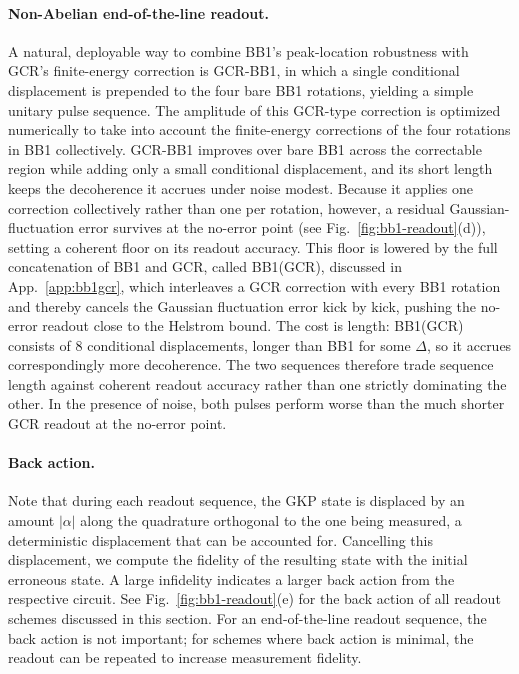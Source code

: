 \documentclass[aps,prx,showpacs,notitlepage,twocolumn,superscriptaddress,nofootinbib,preprintnumbers,floatfix,10pt, longbibliography]{revtex4-2}
\begin{document}
\paragraph{Non-Abelian end-of-the-line readout.} A natural, deployable way to combine BB1's peak-location robustness with GCR's finite-energy correction is GCR-BB1, in which a single conditional displacement is prepended to the four bare BB1 rotations, yielding a simple unitary pulse sequence. The amplitude of this GCR-type correction is optimized numerically to take into account the finite-energy corrections of the four rotations in BB1 collectively. GCR-BB1 improves over bare BB1 across the correctable region while adding only a small conditional displacement, and its short length keeps the decoherence it accrues under noise modest. Because it applies one correction collectively rather than one per rotation, however, a residual Gaussian-fluctuation error survives at the no-error point (see Fig.~\ref{fig:bb1-readout}(d)), setting a coherent floor on its readout accuracy. This floor is lowered by the full concatenation of BB1 and GCR, called BB1(GCR), discussed in App.~\ref{app:bb1gcr}, which interleaves a GCR correction with every BB1 rotation and thereby cancels the Gaussian fluctuation error kick by kick, pushing the no-error readout close to the Helstrom bound. The cost is length: BB1(GCR) consists of $8$ conditional displacements, longer than BB1 for some $\Delta$, so it accrues correspondingly more decoherence. The two sequences therefore trade sequence length against coherent readout accuracy rather than one strictly dominating the other. In the presence of noise, both pulses perform worse than the much shorter GCR readout at the no-error point.


\paragraph{Back action.} Note that during each readout sequence, the GKP state is displaced by an amount $|\alpha|$ along the quadrature orthogonal to the one being measured, a deterministic displacement that can be accounted for. Cancelling this displacement, we compute the fidelity of the resulting state with the initial erroneous state. A large infidelity indicates a larger back action from the respective circuit. See Fig.~\ref{fig:bb1-readout}(e) for the back action of all readout schemes discussed in this section. For an end-of-the-line readout sequence, the back action is not important; for schemes where back action is minimal, the readout can be repeated to increase measurement fidelity.
\end{document}
